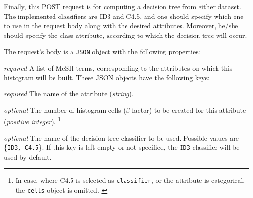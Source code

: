 \subsubsection[/smpc/decisionTree POST request]{\protect{}}\label{sss:post3}
Finally, this POST request is for computing a decision tree from either dataset.
The implemented classifiers are ID3 and C4.5, and one should specify which one to use in the request body along with the desired attributes.
Moreover, he/she should specify the class-attribute, according to which the decision tree will occur.
\begin{description}[labelwidth=5em, leftmargin=\dimexpr\labelwidth+\labelsep\relax]
     \item[Request:] The request's body is a \texttt{JSON} object with the following properties:

\begin{description}[labelwidth=9em, leftmargin=\dimexpr\labelwidth+\labelsep\relax]

    \item[\texttt{attributes}:] {\color{red}\textit{required}} A list of MeSH terms, corresponding to the attributes on which this histogram will be built.
    These JSON objects have the following keys:

    \begin{description}[labelwidth=3em, leftmargin=\dimexpr\labelwidth+\labelsep\relax]
        \item[\texttt{name}:] {\color{red}\textit{required}} The name of the attribute (\textit{string}).

        \item[\texttt{cells}:] {\color{blue}\textit{optional}} The number of histogram cells ($\beta$ factor) to be created for this attribute (\textit{positive integer}). \footnote{In case, where C4.5 is selected as \texttt{classifier}, or the attribute is categorical, the \texttt{cells} object is omitted. \label{refnote1}}
    \end{description}

    \item[\texttt{classifier}:] {\color{blue}\textit{optional}} The name of the decision tree classifier to be used.
    Possible values are \{\texttt{ID3, C4.5}\}.
    If this key is left empty or not specified, the \texttt{ID3} classifier will be used by default.


\end{description}
\end{description}

